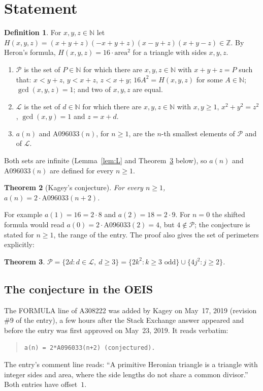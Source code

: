 \documentclass[11pt]{amsart}
\theoremstyle{plain}
\newtheorem{theorem}{Theorem}
\theoremstyle{definition}
\newtheorem{definition}[theorem]{Definition}
\newcommand{\N}{\mathbb{N}}
\newcommand{\Z}{\mathbb{Z}}
\newcommand{\Per}{\mathcal{P}}
\newcommand{\Leg}{\mathcal{L}}
\begin{document}
\section{Statement}\label{sec:statement}

\begin{definition}\label{def:main}
For $x,y,z\in\N$ let $H(x,y,z)=(x+y+z)(-x+y+z)(x-y+z)(x+y-z)\in\Z$. By Heron's formula, $H(x,y,z)=16\cdot\mathrm{area}^2$ for a triangle with sides $x,y,z$.
\begin{enumerate}
\item $\Per$ is the set of $P\in\N$ for which there are $x,y,z\in\N$ with $x+y+z=P$ such that: $x<y+z$, $y<x+z$, $z<x+y$; $16A^2=H(x,y,z)$ for some $A\in\N$; $\gcd(x,y,z)=1$; and two of $x,y,z$ are equal.
\item $\Leg$ is the set of $d\in\N$ for which there are $x,y,z\in\N$ with $x,y\ge1$, $x^2+y^2=z^2$, $\gcd(x,y)=1$ and $z=x+d$.
\item $a(n)$ and $\mathrm{A096033}(n)$, for $n\ge1$, are the $n$-th smallest elements of $\Per$ and of $\Leg$.
\end{enumerate}
\end{definition}

Both sets are infinite (Lemma~\ref{lem:L} and Theorem~\ref{thm:set} below), so $a(n)$ and $\mathrm{A096033}(n)$ are defined for every $n\ge1$.

\begin{theorem}[Kagey's conjecture]\label{thm:main}
For every $n\ge1$, $a(n)=2\cdot\mathrm{A096033}(n+2)$.
\end{theorem}

For example $a(1)=16=2\cdot8$ and $a(2)=18=2\cdot9$. For $n=0$ the shifted formula would read $a(0)=2\cdot\mathrm{A096033}(2)=4$, but $4\notin\Per$; the conjecture is stated for $n\ge1$, the range of the entry. The proof also gives the set of perimeters explicitly:

\begin{theorem}\label{thm:set}
$\Per=\{2d: d\in\Leg,\ d\ge3\}=\{2k^2: k\ge3 \text{ odd}\}\cup\{4j^2: j\ge2\}$.
\end{theorem}

\subsection*{The conjecture in the OEIS}
The FORMULA line of A308222 \cite{A308222} was added by Kagey on May~17, 2019 (revision \#9 of the entry), a few hours after the Stack Exchange answer \cite{MSEa} appeared and before the entry was first approved on May~23, 2019. It reads verbatim:
\begin{quote}
\verb|a(n) = 2*A096033(n+2) (conjectured).|
\end{quote}
The entry's comment line reads: ``A primitive Heronian triangle is a triangle with integer sides and area, where the side lengths do not share a common divisor.'' Both entries have offset~$1$.
\end{document}

